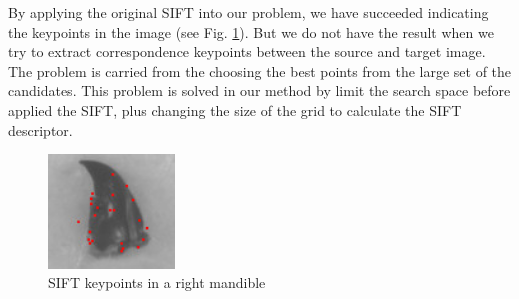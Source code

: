 \documentclass{gretsi}
\begin{document}
By applying the original SIFT into our problem, we have succeeded indicating the keypoints in the image (see Fig. \ref{fig3}). But we do not have the result when we try to extract correspondence keypoints between the source and target image. The problem is carried from the choosing the best points from the large set of the candidates. This problem is solved in our method by limit the search space before applied the SIFT, plus changing the size of the grid to calculate the SIFT descriptor.
\begin{figure}[htb]
    \centering
    \includegraphics[width=0.3\textwidth]{./images/siftc}
    \caption{SIFT keypoints in a right mandible}
    \label{fig3}
\end{figure}
\end{document}
